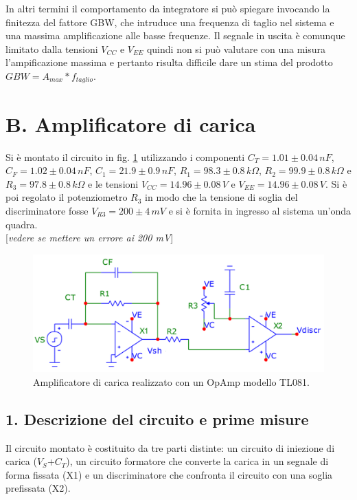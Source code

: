 \documentclass[10pt,a4paper]{article}
\newcommand{\rem}[1]{[\emph{#1}]}
\begin{document}
In altri termini il comportamento da integratore si può spiegare invocando la finitezza del fattore GBW, che intruduce una frequenza di taglio nel sistema e una massima amplificazione alle basse frequenze. Il segnale in uscita è comunque limitato dalla tensioni $V_{CC}$ e $V_{EE}$ quindi non si può valutare con una misura l'ampificazione massima e pertanto risulta difficile dare un stima del prodotto $GBW = A_{max} * f_{taglio}$.

\section*{B. Amplificatore di carica}

Si è montato il circuito in fig. \ref{circuito2} utilizzando i componenti $C_T = 1.01\pm0.04 \, nF$, $C_F = 1.02 \pm 0.04 \, nF$, $C_1 = 21.9 \pm 0.9 \, nF$, $R_1 = 98.3 \pm 0.8 \, k \Omega$, $R_2 = 99.9 \pm 0.8 \, k\Omega$ e $R_3 = 97.8 \pm 0.8 \, k \Omega$ e le tensioni $V_{CC} = 14.96\pm0.08 \, V$ e $V_{EE} = 14.96 \pm 0.08 \, V$. Si è poi regolato il potenziometro $R_3$ in modo che la tensione di soglia del discriminatore fosse $V_{R3} = 200 \pm 4 \, mV$ e si è fornita in ingresso al sistema un'onda quadra.\\

\rem{vedere se mettere un errore ai 200 mV}

\begin{figure}[htb!]
\centering
\includegraphics[scale=0.5]{amplificatoreCarica.png}
\caption{Amplificatore di carica realizzato con un OpAmp modello TL081.\label{circuito2}}
\end{figure}

\subsection*{1. Descrizione del circuito e prime misure}
Il circuito montato è costituito da tre parti distinte: un circuito di iniezione di carica ($V_S$+$C_T$), un circuito formatore che converte la carica in un segnale di forma fissata (X1) e un discriminatore che confronta il circuito con una soglia prefissata (X2).
\end{document}
